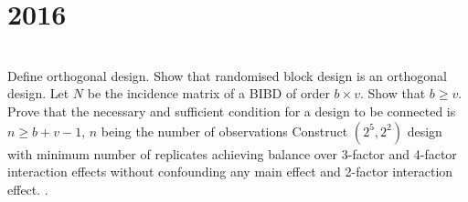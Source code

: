 \section*{2016}
\vspace{-.5cm}
\hrulefill \smallskip\\
 Define orthogonal design. Show that randomised block design is an orthogonal design.
\myline
{} Let $N$ be the incidence matrix of a BIBD of order $b\times v$. Show that $b\geq v$.
\myline
{} Prove that the necessary and sufficient condition for a design to be connected is $n\geq b+v-1$, $n$ being the number of observations
\myline
{} Construct $(2^5,2^2)$ design with minimum number of replicates achieving balance over 3-factor and 4-factor interaction effects without confounding any main effect and 2-factor interaction effect.
.